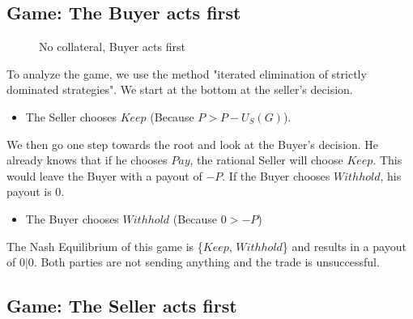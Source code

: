 \documentclass{cacthesis}
\begin{document}
\subsection{Game: The Buyer acts first}
\begin{figure}[htb!]
\newline
\caption{No collateral, Buyer acts first}
\label{fig:nocol-buyer-first}
\end{figure}

To analyze the game, we use the method "iterated elimination of strictly dominated strategies". We start at the bottom at the seller's decision.
\begin{itemize}
    \item The Seller chooses $Keep$ (Because $P > P - U_S(G)$).
\end{itemize}
    We then go one step towards the root and look at the Buyer's decision. He already knows that if he chooses $Pay$, the rational Seller will choose $Keep$. This would leave the Buyer with a payout of $-P$. If the Buyer chooses $Withhold$, his payout is $0$.
\begin{itemize}
    \item The Buyer chooses $Withhold$ (Because $0 > -P$)
\end{itemize} 
The Nash Equilibrium of this game is \{$Keep$, $Withhold$\} and results in a payout of $0|0$. Both parties are not sending anything and the trade is unsuccessful.

\subsection{Game: The Seller acts first} 
\end{document}
